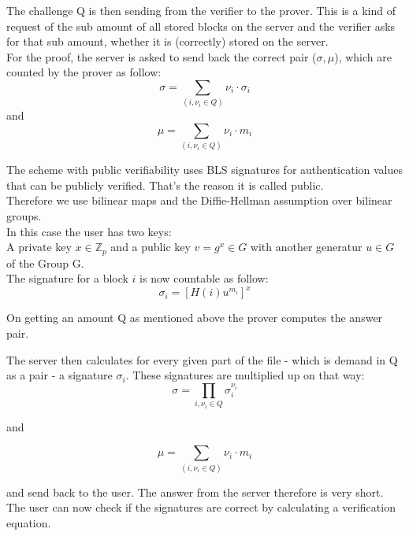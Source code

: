 \documentclass{amsart}
\begin{document}
The challenge Q is then sending from the verifier to the prover. This is a kind of request of the sub amount of all stored blocks on the server and the verifier asks for that sub amount, whether it is (correctly) stored on the server.\\

For the proof, the server is asked to send back the correct pair ($ \sigma, \mu$), which are counted by the prover as follow:\\
\begin{equation}
\sigma = \sum_{(i,\nu_{i} \in Q)} \nu_{i} \cdot \sigma_{i}  
\end{equation}
and
\begin{equation}
\mu = \sum_{(i,\nu_{i} \in Q)} \nu_{i} \cdot m_{i}
\end{equation}

The scheme with public verifiability uses BLS signatures for authentication values that can be publicly verified. That's the reason it is called public.\\
Therefore we use bilinear maps and the Diffie-Hellman assumption over bilinear groups.\\

In this case the user has two keys:\\
A private key $x \in \mathbb{Z}_{p}$ and a public key $ v = g^{x} \in G$ with another generatur $u \in G$ of the Group G.\\
The signature for a block $i$ is now countable as follow:
\begin{equation}
\sigma_{i} = [H(i)u^{m_{i}}]^{x}
\end{equation}

On getting an amount Q as mentioned above the prover computes the answer pair.


The server then calculates for every given part of the file - which is demand in Q as a pair - a signature $ \sigma_{i} $. These signatures are multiplied up on that way:
\begin{equation}
\sigma = \prod_{i, \nu_{i} \in Q} \sigma_{i}^{\nu_{i}}
\end{equation}

and

\begin{equation}
\mu = \sum_{(i,\nu_{i} \in Q)} \nu_{i} \cdot m_{i}
\end{equation}

and send back to the user. The answer from the server therefore is very short. The user can now check if the signatures are correct by calculating a verification equation. 
\end{document}
